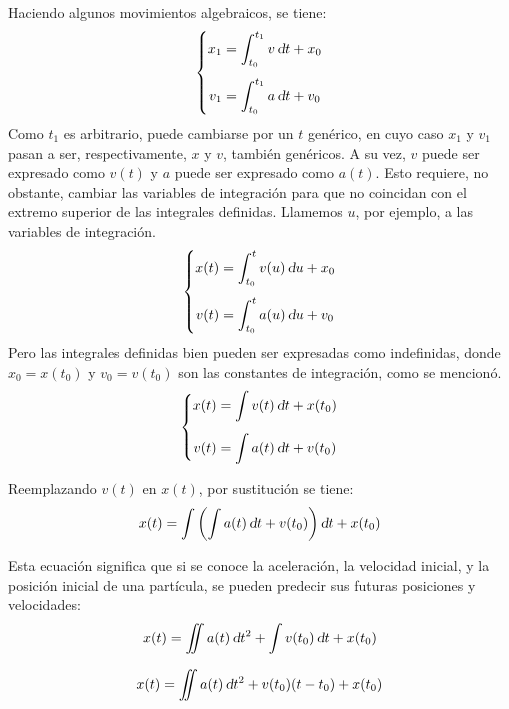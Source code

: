 Haciendo algunos movimientos algebraicos, se tiene:
\[
  \left\{
    \begin{aligned}
    x_1 &= \displaystyle\int_{t_0}^{t_1} v \, \textsl{d} t + x_0
    \\[1ex]
    v_1 &= \displaystyle\int_{t_0}^{t_1} a \, \textsl{d} t + v_0
    \end{aligned}
  \right.
\]
Como $t_1$ es arbitrario, puede cambiarse por un $t$ genérico, en cuyo caso $x_1$ y $v_1$ pasan a ser, respectivamente, $x$ y $v$, también genéricos.
A su vez, $v$ puede ser expresado como $v(t)$ y $a$ puede ser expresado como $a(t)$.
Esto requiere, no obstante, cambiar las variables de integración para que no coincidan con el extremo superior de las integrales definidas.
Llamemos $u$, por ejemplo, a las variables de integración.
\[
  \left\{
    \begin{aligned}
    x(t) &= \displaystyle\int_{t_0}^{t} v(u) \, \textsl{d} u + x_0
    \\[1ex]
    v(t) &= \displaystyle\int_{t_0}^{t} a(u) \, \textsl{d} u + v_0
    \end{aligned}
  \right.
\]
Pero las integrales definidas bien pueden ser expresadas como indefinidas, donde $x_0 = x\left(t_0\right)$ y $v_0 = v\left(t_0\right)$ son las constantes de integración, como se mencionó.
\[
  \left\{
    \begin{aligned}
      x(t) &= \displaystyle\int v(t) \, \textsl{d} t + x(t_0)
      \\[1ex]
      v(t) &= \displaystyle\int a(t) \, \textsl{d} t + v(t_0)
    \end{aligned}
  \right.
\]

Reemplazando $v(t)$ en $x(t)$, por sustitución se tiene:
\[ x(t) = \int \left( \int a(t) \, \textsl{d} t + v(t_0) \right) \textsl{d} t + x(t_0) \]

Esta ecuación significa que si se conoce la aceleración, la velocidad inicial, y la posición inicial de una partícula, se pueden predecir sus futuras posiciones y velocidades:
\[ x(t) = \iint a(t) \, \textsl{d} t^2 + \int v(t_0) \, \textsl{d} t + x(t_0) \]

\begin{mdframed}[style=DefinitionFrame]
    \begin{defn}
        \label{defn:generalMovementEqn}
    \end{defn}
    \begin{equation*}
        x(t) = \displaystyle\iint a(t) \, \textsl{d} t^2 + v(t_0) (t-t_0)   + x(t_0)
    \end{equation*}
\end{mdframed}


